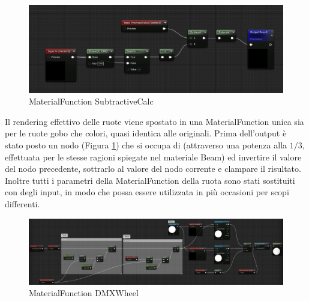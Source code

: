 \documentclass[main.tex]{subfiles}
\begin{document}
\clearpage

\begin{figure}
    \centering
    \captionsetup{justification=centering}
    \includegraphics[scale=0.26]{img/renderingPipeline/SubtractiveCalcFull.jpg}
    \caption{MaterialFunction SubtractiveCalc}
    \label{fig:2_SubtractiveCalc}
\end{figure}
Il rendering effettivo delle ruote viene spostato in una MaterialFunction unica sia per le ruote gobo che colori, quasi identica alle originali. Prima dell'output è stato posto un nodo  (Figura \ref{fig:2_SubtractiveCalc}) che si occupa di  (attraverso una potenza alla $1/3$, effettuata per le stesse ragioni spiegate nel materiale Beam) ed invertire il valore del nodo precedente, sottrarlo al valore del nodo corrente e clampare il risultato. 
Inoltre tutti i parametri della MaterialFunction della ruota sono stati sostituiti con degli input, in modo che possa essere utilizzata in più occasioni per scopi differenti.
\begin{figure}[H]
    \centering
    \includegraphics[width=1\linewidth]{img/renderingPipeline/DMXWheelFuul.jpg}
    \caption{MaterialFunction DMXWheel}
    \label{fig:2_dmxWheel}
\end{figure}
\end{document}
